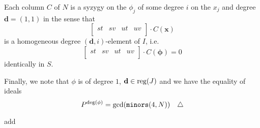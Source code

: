\documentclass[fleqn,reqno]{amsart}
\numberwithin{first}{chapter}
\begin{document}
\begin{example}[$\mt{ex203}$]
Each column $C$ of $N$ is a syzygy on the $\phi_j$ of some degree $i$ on the $x_j$
and degree $\mathbf d=(1,1)$ in the sense that
\[
	\begin{bmatrix}s t&
	       s v&
	       u t&
	       u v\\
	       \end{bmatrix}
		   \cdot C(\mathbf x)
\]
is a homogeneous degree $(\mathbf d,i)$-element of $I$, i.e.
\[
	\begin{bmatrix}s t&
	       s v&
	       u t&
	       u v\\
	       \end{bmatrix}
		   \cdot C(\mathbf\phi)=0
\]
identically in $S$.

Finally, we note that $\phi$ is of degree $1$, $\mathbf d\in\operatorname{reg}(J)$ and we have the equality of ideals
\[
	P^{\deg(\phi)}=\gcd(\mt{minors}(4,N))\demo
\]
\end{example}

\begin{example}[$\mt{ex204}$]
\label{ex204}
add
\end{example}





\end{document}
